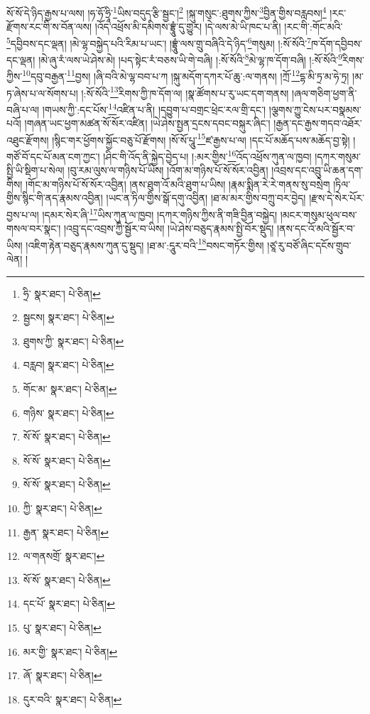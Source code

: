 སོ་སོ་དེ་ཉིད་རྒྱས་པ་ལས། །ཧ་ཧོ་ཧྲཱི་\footnote{ཧྲི་  སྣར་ཐང་།  པེ་ཅིན། }ཡིས་བདུད་རྩི་སྦྱང་།\footnote{སྦྱངས།  སྣར་ཐང་།  པེ་ཅིན། } །སྐུ་གསུང་:ཐུགས་ཀྱིས་\footnote{ཐུགས་ཀྱི་  སྣར་ཐང་།  པེ་ཅིན། }བྱིན་གྱིས་བརླབས།\footnote{བརླབ།  སྣར་ཐང་།  པེ་ཅིན། } །རང་རྫོགས་རང་གི་ས་བོན་ལས། །འོད་འཕྲོས་མི་དམིགས་བྷྲཱུཾ་དུ་གྱུར། །དེ་ལས་མེ་ཡི་ཁང་པ་ནི། །རང་གི་:གོང་མའི་\footnote{གོང་མ་  སྣར་ཐང་།  པེ་ཅིན། }དབྱིབས་དང་ལྡན། །མེ་ལྷ་བསྐྱེད་པའི་རིམ་པ་ཡང་། །བྷྲཱུཾ་ལས་གྲུ་བཞིའི་དེ་ཉིད་\footnote{གཉིས་  སྣར་ཐང་།  པེ་ཅིན། }གསུམ། །:སོ་སོའི་\footnote{སོ་སོ་  སྣར་ཐང་།  པེ་ཅིན། }ཁ་དོག་དབྱིབས་དང་ལྡན། །མེ་ཞུ་རཾ་ལས་ཡེ་ཤེས་མེ། །པད་སྟེང་རཾ་བཅས་ཡི་གེ་བཞི། །:སོ་སོའི་\footnote{སོ་སོ་  སྣར་ཐང་།  པེ་ཅིན། }མེ་ལྷ་ཁ་དོག་བཞི། །:སོ་སོའི་\footnote{སོ་སོ་  སྣར་ཐང་།  པེ་ཅིན། }རིགས་ཀྱིས་\footnote{ཀྱི་  སྣར་ཐང་།  པེ་ཅིན། }དབུ་བརྒྱན་\footnote{རྒྱན་  སྣར་ཐང་།  པེ་ཅིན། }བྱས། །ཞི་བའི་མེ་ལྷ་བབ་པ་ཀ །སྐུ་མདོག་དཀར་པོ་ཆུ་:ལ་གནས། །ཀྲོ་\footnote{ལ་གནསགྲོ་  སྣར་ཐང་། }དྷ་མི་ཏྲ་མ་ཧེ་ཏྲ། །མ་ཏ་ཞེས་པ་ལ་སོགས་པ། །:སོ་སོའི་\footnote{སོ་སོ་  སྣར་ཐང་།  པེ་ཅིན། }རིགས་ཀྱི་ཁ་དོག་ལ། །སྣ་ཚོགས་པ་རུ་ཡང་དག་གནས། །ཞལ་གཅིག་ཕྱག་ནི་བཞི་པ་ལ། །གཡས་ཀྱི་:དང་པོས་\footnote{དང་པོ་  སྣར་ཐང་།  པེ་ཅིན། }འཛིན་པ་ནི། །དབྱུག་པ་བགྲང་ཕྲེང་རལ་གྲི་དང་། །ལྕགས་ཀྱུ་ངེས་པར་བསྣམས་པའོ། །གཞན་ཡང་ཕྱག་མཚན་སོ་སོར་འཛིན། །ཡེ་ཤེས་སྤྱན་དྲངས་དབང་བསྐུར་ཞིང་། །རྒྱན་དང་རྒྱས་གདབ་འཐོར་འཐུང་རྫོགས། །སྙིང་གར་ཕྱོགས་སྐྱོང་བཅུ་པོ་རྫོགས། །སོ་སོ་པཱུ་\footnote{པུ་  སྣར་ཐང་།  པེ་ཅིན། }ཛ་རྒྱས་པ་ལ། །དང་པོ་མཆོད་པས་མཆོད་བྱ་སྟེ། །གཙོ་བོ་དང་པོ་མན་ངག་ཀྱང་། །ཤིང་གི་འོད་ནི་སྐྱེད་བྱེད་པ། །:མར་གྱིས་\footnote{མར་གྱི་  སྣར་ཐང་།  པེ་ཅིན། }འོད་འཕྲོས་ཀུན་ལ་ཁྱབ། །དཀར་གསུམ་སྤྱི་ཡི་སྡིག་པ་སེལ། །བུ་རམ་ལུས་ལ་གཉིས་པོ་ཡིས། །འོག་མ་གཉིས་པོ་སོ་སོར་འབྱིན། །འབྲས་དང་འབྲུ་ཡི་ཆན་དག་གིས། །གོང་མ་གཉིས་པོ་སོ་སོར་འབྱིན། །ནས་ཐུག་འོ་མའི་ཐུག་པ་ཡིས། །རྣམ་སྨིན་རེ་རེ་གནས་སུ་བསྲེག །ཏིལ་གྱིས་སྙིང་གི་ནད་རྣམས་འབྱིན། །ཡང་ན་ཏིལ་གྱིས་སྒོ་དགུ་འབྱིན། །ཐ་མ་མར་གྱིས་བཀྲུ་བར་བྱེད། །རྫས་དེ་སེར་པོར་བྱས་པ་ལ། །དམར་སེར་ཞི་\footnote{ཞོ་  སྣར་ཐང་།  པེ་ཅིན། }ཡིས་ཀུན་ལ་ཁྱབ། །དཀར་གཉིས་ཀྱིས་ནི་གཟི་བྱིན་བསྐྱེད། །མངར་གསུམ་ཕུལ་བས་གསལ་བར་སྣང་། །འབྲུ་དང་འབྲས་ཀྱི་སྦྱོར་བ་ཡིས། །ཡེ་ཤེས་བཅུད་རྣམས་སྤྱི་བོར་སྡུད། །ནས་དང་འོ་མའི་སྦྱོར་བ་ཡིས། །འཇིག་རྟེན་བཅུད་རྣམས་ཀུན་དུ་སྡུད། །ཐ་མ་:དཱུར་བའི་\footnote{དུར་བའི་  སྣར་ཐང་།  པེ་ཅིན། }བསང་གཏོར་གྱིས། །ཙཱ་རུ་བཙོ་ཞིང་དངོས་གྲུབ་ལེན། །
